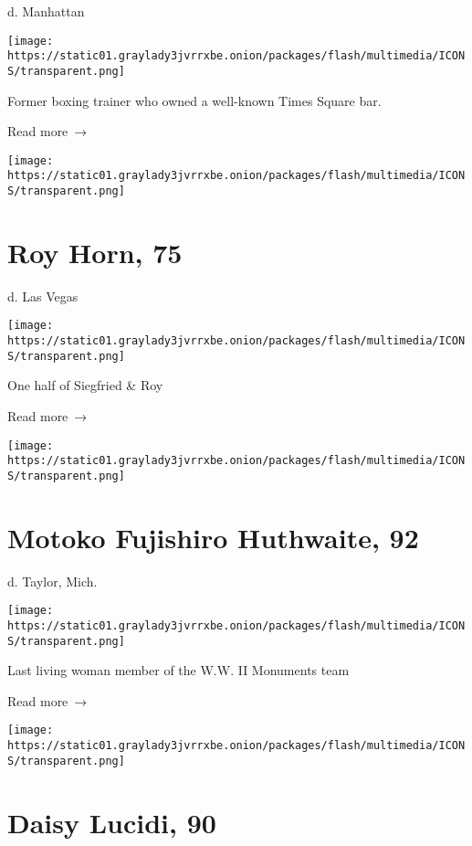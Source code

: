 d. Manhattan

\texttt{[image: https://static01.graylady3jvrrxbe.onion/packages/flash/multimedia/ICONS/transparent.png]}

Former boxing trainer who owned a well-known Times Square bar.

 Read more~→

\href{https://www.nytimes3xbfgragh.onion/2020/05/08/obituaries/roy-horn-dead-covid.html}{}

\texttt{[image: https://static01.graylady3jvrrxbe.onion/packages/flash/multimedia/ICONS/transparent.png]}

\hypertarget{roy-horn-75}{%
\section{Roy Horn, 75}\label{roy-horn-75}}

d. Las Vegas

\texttt{[image: https://static01.graylady3jvrrxbe.onion/packages/flash/multimedia/ICONS/transparent.png]}

One half of Siegfried \& Roy

 Read more~→

\href{https://www.nytimes3xbfgragh.onion/2020/05/08/us/motoko-fujishiro-huthwaite-dead-coronavirus.html}{}

\texttt{[image: https://static01.graylady3jvrrxbe.onion/packages/flash/multimedia/ICONS/transparent.png]}

\hypertarget{motoko-fujishiro-huthwaite-92}{%
\section{Motoko Fujishiro Huthwaite,
92}\label{motoko-fujishiro-huthwaite-92}}

d. Taylor, Mich.

\texttt{[image: https://static01.graylady3jvrrxbe.onion/packages/flash/multimedia/ICONS/transparent.png]}

Last living woman member of the W.W. II Monuments team

 Read more~→

\href{https://www.nytimes3xbfgragh.onion/2020/05/08/obituaries/daisy-lucidi-dead-coronavirus.html}{}

\texttt{[image: https://static01.graylady3jvrrxbe.onion/packages/flash/multimedia/ICONS/transparent.png]}

\hypertarget{daisy-lucidi-90}{%
\section{Daisy Lucidi, 90}\label{daisy-lucidi-90}}

